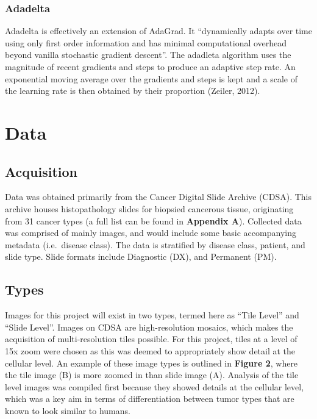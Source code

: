 \documentclass[12pt,]{article}
\begin{document}
\subsubsection{Adadelta}\label{adadelta}

Adadelta is effectively an extension of AdaGrad. It ``dynamically adapts
over time using only first order information and has minimal
computational overhead beyond vanilla stochastic gradient descent''. The
adadleta algorithm uses the magnitude of recent gradients and steps to
produce an adaptive step rate. An exponential moving average over the
gradients and steps is kept and a scale of the learning rate is then
obtained by their proportion (Zeiler, 2012).

\section{Data}\label{data}

\subsection{Acquisition}\label{acquisition}

Data was obtained primarily from the Cancer Digital Slide Archive
(CDSA). This archive houses histopathology slides for biopsied cancerous
tissue, originating from 31 cancer types (a full list can be found in
\textbf{Appendix A}). Collected data was comprised of mainly images, and
would include some basic accompanying metadata (i.e.~disease class). The
data is stratified by disease class, patient, and slide type. Slide
formats include Diagnostic (DX), and Permanent (PM).

\subsection{Types}\label{types}

Images for this project will exist in two types, termed here as ``Tile
Level'' and ``Slide Level''. Images on CDSA are high-resolution mosaics,
which makes the acquisition of multi-resolution tiles possible. For this
project, tiles at a level of 15x zoom were chosen as this was deemed to
appropriately show detail at the cellular level. An example of these
image types is outlined in \textbf{Figure 2}, where the tile image (B)
is more zoomed in than slide image (A). Analysis of the tile level
images was compiled first because they showed details at the cellular
level, which was a key aim in terms of differentiation between tumor
types that are known to look similar to humans.
\end{document}
